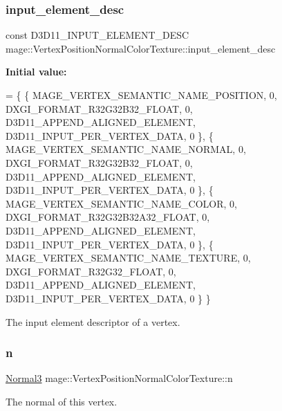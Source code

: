 \subsubsection{\texorpdfstring{input\+\_\+element\+\_\+desc}{input\_element\_desc}}
{\footnotesize\ttfamily const D3\+D11\+\_\+\+I\+N\+P\+U\+T\+\_\+\+E\+L\+E\+M\+E\+N\+T\+\_\+\+D\+E\+SC mage\+::\+Vertex\+Position\+Normal\+Color\+Texture\+::input\+\_\+element\+\_\+desc\hspace{0.3cm}{\ttfamily [static]}}

{\bfseries Initial value\+:}
\begin{DoxyCode}
= \{
        \{ MAGE\_VERTEX\_SEMANTIC\_NAME\_POSITION, 0, DXGI\_FORMAT\_R32G32B32\_FLOAT,    0, 
      D3D11\_APPEND\_ALIGNED\_ELEMENT, D3D11\_INPUT\_PER\_VERTEX\_DATA, 0 \},
        \{ MAGE\_VERTEX\_SEMANTIC\_NAME\_NORMAL,   0, DXGI\_FORMAT\_R32G32B32\_FLOAT,    0, 
      D3D11\_APPEND\_ALIGNED\_ELEMENT, D3D11\_INPUT\_PER\_VERTEX\_DATA, 0 \},
        \{ MAGE\_VERTEX\_SEMANTIC\_NAME\_COLOR,    0, DXGI\_FORMAT\_R32G32B32A32\_FLOAT, 0, 
      D3D11\_APPEND\_ALIGNED\_ELEMENT, D3D11\_INPUT\_PER\_VERTEX\_DATA, 0 \},
        \{ MAGE\_VERTEX\_SEMANTIC\_NAME\_TEXTURE,  0, DXGI\_FORMAT\_R32G32\_FLOAT,       0, 
      D3D11\_APPEND\_ALIGNED\_ELEMENT, D3D11\_INPUT\_PER\_VERTEX\_DATA, 0 \}
    \}
\end{DoxyCode}
The input element descriptor of a vertex. \hypertarget{structmage_1_1_vertex_position_normal_color_texture_a7304bf677ad4f16aea974e63f4324eba}{}\label{structmage_1_1_vertex_position_normal_color_texture_a7304bf677ad4f16aea974e63f4324eba} 
\subsubsection{\texorpdfstring{n}{n}}
{\footnotesize\ttfamily \hyperlink{structmage_1_1_normal3}{Normal3} mage\+::\+Vertex\+Position\+Normal\+Color\+Texture\+::n}

The normal of this vertex. \hypertarget{structmage_1_1_vertex_position_normal_color_texture_a6a4a2cf057a12027ad47df9651021bdb}{}\label{structmage_1_1_vertex_position_normal_color_texture_a6a4a2cf057a12027ad47df9651021bdb} 
